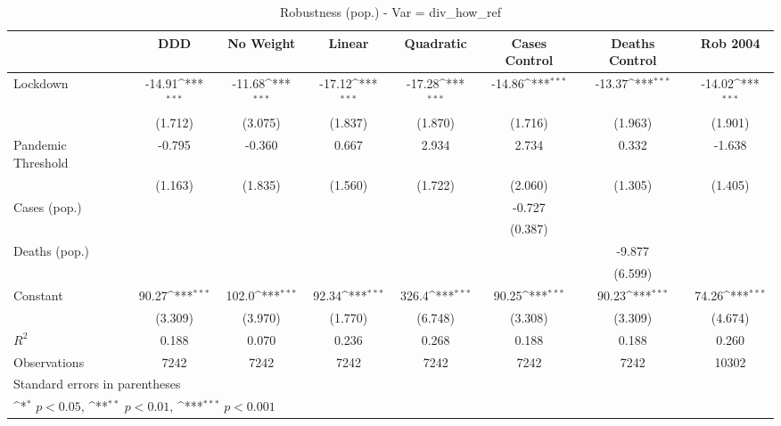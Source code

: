 \documentclass{article}
\begin{document}
{
\def\sym#1{\ifmmode^{#1}\else\(^{#1}\)\fi}
\begin{longtable}{l*{7}{c}}
\caption{Robustness (pop.) - Var = div\_how\_ref}\\
\hline\hline\endfirsthead\hline\endhead\hline\endfoot\endlastfoot
                &\multicolumn{1}{c}{DDD}&\multicolumn{1}{c}{No Weight}&\multicolumn{1}{c}{Linear}&\multicolumn{1}{c}{Quadratic}&\multicolumn{1}{c}{Cases Control}&\multicolumn{1}{c}{Deaths Control}&\multicolumn{1}{c}{Rob 2004}\\
\hline
Lockdown        &   -14.91\sym{***}&   -11.68\sym{***}&   -17.12\sym{***}&   -17.28\sym{***}&   -14.86\sym{***}&   -13.37\sym{***}&   -14.02\sym{***}\\
                &  (1.712)         &  (3.075)         &  (1.837)         &  (1.870)         &  (1.716)         &  (1.963)         &  (1.901)         \\
Pandemic Threshold&   -0.795         &   -0.360         &    0.667         &    2.934         &    2.734         &    0.332         &   -1.638         \\
                &  (1.163)         &  (1.835)         &  (1.560)         &  (1.722)         &  (2.060)         &  (1.305)         &  (1.405)         \\
Cases (pop.)    &                  &                  &                  &                  &   -0.727         &                  &                  \\
                &                  &                  &                  &                  &  (0.387)         &                  &                  \\
Deaths (pop.)   &                  &                  &                  &                  &                  &   -9.877         &                  \\
                &                  &                  &                  &                  &                  &  (6.599)         &                  \\
Constant        &    90.27\sym{***}&    102.0\sym{***}&    92.34\sym{***}&    326.4\sym{***}&    90.25\sym{***}&    90.23\sym{***}&    74.26\sym{***}\\
                &  (3.309)         &  (3.970)         &  (1.770)         &  (6.748)         &  (3.308)         &  (3.309)         &  (4.674)         \\
\hline
\(R^{2}\)       &    0.188         &    0.070         &    0.236         &    0.268         &    0.188         &    0.188         &    0.260         \\
Observations    &     7242         &     7242         &     7242         &     7242         &     7242         &     7242         &    10302         \\
\hline\hline
\multicolumn{8}{l}{\footnotesize Standard errors in parentheses}\\
\multicolumn{8}{l}{\footnotesize \sym{*} \(p<0.05\), \sym{**} \(p<0.01\), \sym{***} \(p<0.001\)}\\
\end{longtable}
}
\end{document}

